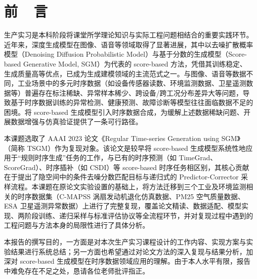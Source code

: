 \clearpage
{}
\setcounter{page}{1}

\chapter*{前\ \ 言}

生产实习是本科阶段将课堂所学理论知识与实际工程问题相结合的重要实践环节。近年来，深度生成模型在图像、语音等领域取得了显著进展，其中以去噪扩散概率模型（Denoising Diffusion Probabilistic Model）与基于分数的生成模型（Score-based Generative Model, SGM）为代表的 score-based 方法，凭借其训练稳定、生成质量高等优点，已成为生成建模领域的主流范式之一。与图像、语音等数据不同，工业场景中的多元时序数据（如设备传感器读数、环境监测数据、卫星遥测数据等）普遍存在标注稀缺、异常样本稀少、跨设备/跨工况分布差异大等问题，导致基于时序数据训练的异常检测、健康预测、故障诊断等模型往往面临数据不足的困境。将 score-based 生成模型引入时序数据合成，为缓解上述数据稀缺问题、开展数据增强与仿真验证提供了一条可行路径。

本课题选取了 AAAI 2023 论文《Regular Time-series Generation using SGM》（简称 TSGM）作为复现对象。该论文是较早将 score-based 生成模型系统性地应用于“规则时序生成”任务的工作，与已有的时序预测（如 TimeGrad、ScoreGrad）、时序插补（如 CSDI）等 score-based 时序任务相区别，其核心贡献在于提出了隐空间中的条件去噪分数匹配目标与递归式的 Predictor-Corrector 采样流程。本课题在原论文实验设置的基础上，将方法迁移到三个工业及环境监测相关的时序数据集（C-MAPSS 涡扇发动机退化仿真数据、PM25 空气质量数据、ESA 卫星遥测异常数据）上进行了完整复现，覆盖论文精读、数据适配、模型实现、两阶段训练、递归采样与标准评估协议等全流程环节，并对复现过程中遇到的工程问题与方法本身的局限性进行了具体分析。

本报告的撰写目的，一方面是对本次生产实习课程设计的工作内容、实现方案与实验结果进行系统总结；另一方面也希望通过对论文方法的深入复现与结果分析，加深对 score-based 生成模型在时序数据领域应用的理解。由于本人水平有限，报告中难免存在不足之处，恳请各位老师批评指正。
